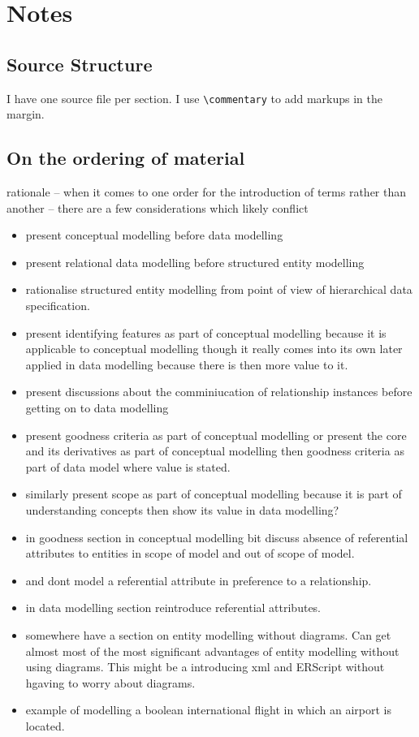 
\section{Notes}
\subsection{Source Structure}
\mynote I  have one source file per section.
\mynote I  use \verb'\commentary' to add markups in the margin.

\subsection{On the ordering of material}
\mynote rationale -- when it comes to one order for the introduction of terms rather than another -- there are a few considerations which likely conflict
\begin{itemize}
	\item  present conceptual modelling before data modelling
	\item  present relational data modelling before structured entity modelling
	\item rationalise structured entity modelling from point of view of hierarchical data specification. 
	\item  present identifying features as part of conceptual modelling because
	it is applicable to conceptual modelling though it really comes into its own
	later applied in data modelling
	because there is then more value to it.
	\item present discussions about the comminiucation of relationship instances before 
		getting on to data modelling
	\item   present goodness criteria as part of conceptual modelling
	or present the core and its derivatives as part of conceptual modelling then goodness criteria as part of data model where value is stated.
	\item similarly present scope as part of conceptual modelling because it is part of understanding concepts then show its value in data modelling? 
	\item in goodness section in conceptual modelling bit discuss absence of referential attributes to entities in scope of model and out of scope of model.
	\item and dont model a referential attribute in preference to a relationship.
	\item in data modelling section reintroduce referential attributes. 
	\item somewhere have a section on entity modelling without diagrams. Can get almost most of the most significant advantages of entity modelling without using diagrams. This might be a  introducing xml and ERScript without hgaving to worry about diagrams.
	\item example of modelling a boolean international flight in which an airport is located.
\end{itemize}
